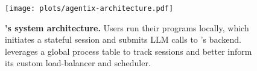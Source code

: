 \begin{figure}[t]
    \centering
    \texttt{[image: plots/agentix-architecture.pdf]}
    \caption{\small\textbf{\text{\name}'s system architecture.} Users run their programs locally, which initiates a stateful session and submits LLM calls to \text{\name}'s backend. \text{\name} leverages a global process table to track sessions and better inform its custom load-balancer and scheduler.}
    \label{fig:architecture}
     \vspace{-6mm}
 \end{figure}